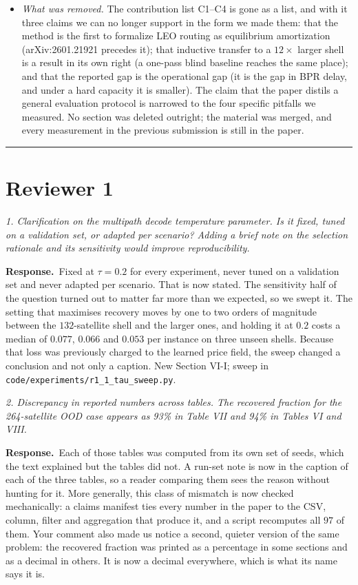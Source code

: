 \documentclass[11pt]{article}
\newcommand{\rc}[1]{\medskip\noindent\textit{\textcolor{black!65}{#1}}\par\smallskip}
\newcommand{\ans}{\noindent\textbf{Response.}\ }
\begin{document}
\begin{itemize}[leftmargin=1.4em,itemsep=2pt]
\item \emph{What was removed.} The contribution list C1--C4 is gone as a list, and with it three
claims we can no longer support in the form we made them: that the method is the first to formalize
LEO routing as equilibrium amortization (arXiv:2601.21921 precedes it); that inductive transfer to a
$12\times$ larger shell is a result in its own right (a one-pass blind baseline reaches the same
place); and that the reported gap is the operational gap (it is the gap in BPR delay, and under a
hard capacity it is smaller). The claim that the paper distils a general evaluation protocol is
narrowed to the four specific pitfalls we measured. No section was deleted outright; the material
was merged, and every measurement in the previous submission is still in the paper.
\end{itemize}

\hrule
\section*{Reviewer 1}

\rc{1. Clarification on the multipath decode temperature parameter. Is it fixed, tuned on a
validation set, or adapted per scenario? Adding a brief note on the selection rationale and its
sensitivity would improve reproducibility.}
\ans Fixed at $\tau=0.2$ for every experiment, never tuned on a validation set and never adapted
per scenario. That is now stated. The sensitivity half of the question turned out to matter far
more than we expected, so we swept it. The setting that maximises recovery moves by one to two
orders of magnitude between the $132$-satellite shell and the larger ones, and holding it at $0.2$
costs a median of $0.077$, $0.066$ and $0.053$ per instance on three unseen shells. Because that
loss was previously charged to the learned price field, the sweep changed a conclusion and not only
a caption. New Section VI-I; sweep in \texttt{code/experiments/r1\_1\_tau\_sweep.py}.

\rc{2. Discrepancy in reported numbers across tables. The recovered fraction for the 264-satellite
OOD case appears as 93\% in Table VII and 94\% in Tables VI and VIII.}
\ans Each of those tables was computed from its own set of seeds, which the text explained but the
tables did not. A run-set note is now in the caption of each of the three tables, so a reader
comparing them sees the reason without hunting for it. More generally, this class of mismatch is
now checked mechanically: a claims manifest ties every number in the paper to the CSV, column,
filter and aggregation that produce it, and a script recomputes all $97$ of them. Your comment also
made us notice a second, quieter version of the same problem: the recovered fraction was printed as
a percentage in some sections and as a decimal in others. It is now a decimal everywhere, which is
what its name says it is.
\end{document}
